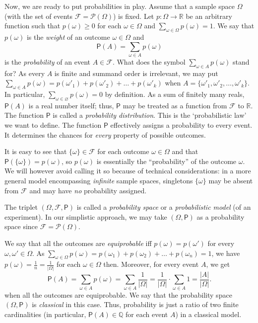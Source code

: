 \documentclass[12pt,notitlepage]{article}
\theoremstyle{plain}
\theoremstyle{definition}
\theoremstyle{plain}
\newcommand{\Q}{\mathbb{Q}}
\newcommand{\R}{\mathbb{R}}
\newcommand{\void}{\varnothing}
\newcommand{\mP}{\mathcal{P}}
\newcommand{\1}{\mathbf{1}}
\newcommand{\0}{\mathbf{0}}
\newcommand{\mF}{\mathcal{F}}
\renewcommand{\P}{\mathsf{P}}
\begin{document}
Now, we are ready to put probabilities in play. Assume that a sample space $\Omega$ (with the set of events $\mF = \mP(\Omega)$) is fixed. Let $p\colon \Omega \to \R$ be an arbitrary function such that $p(\omega) \geq 0$ for each $\omega \in \Omega$ and $\sum_{\omega \in \Omega} p(\omega) = 1$. We say that $p(\omega)$ is the \emph{weight} of an outcome $\omega \in \Omega$ and $$\P(A) = \sum_{\omega \in A} p(\omega)$$ is the \emph{probability} of an event $A \in \mF$. What does the symbol $\sum_{\omega \in A} p(\omega)$ stand for? As every $A$ is finite and summand order is irrelevant, we may put $\sum_{\omega \in A} p(\omega) = p(\omega'_1) + p(\omega'_2) + \ldots + p(\omega'_k)$ when $A = \{\omega'_1, \omega'_2, \ldots, \omega'_k\}$. In particular, $\sum_{\omega \in \void} p(\omega) = 0$ by definition. As a sum of finitely many reals, $\P(A)$ is a real number itself; thus, $\P$ may be treated as a function from $\mF$ to $\R$. The function $\P$ is called a \emph{probability distribution}. This is the `probabilistic law' we want to define. The function $\P$ effectively assigns a probability to every event. It determines the chances for \emph{every} property of possible outcomes.

It is easy to see that $\{ \omega \} \in \mF$ for each outcome $\omega \in \Omega$ and that $\P(\{ \omega \}) = p(\omega)$, so $p(\omega)$ is essentially the ``probability'' of the outcome $\omega$. We will however avoid calling it so because of technical considerations: in a more general model encompassing \emph{infinite} sample spaces, singletons $\{ \omega \}$ may be absent from $\mF$ and may have \emph{no} probability assigned.

The triplet $(\Omega, \mF, \P)$ is called a \emph{probability space} or a \emph{probabilistic model} (of an experiment). In our simplistic approach, we may take $(\Omega, \P)$ as a probability space since $\mF = \mP(\Omega)$.

We say that all the outcomes are \emph{equiprobable} iff $p(\omega) = p(\omega')$ for every $\omega, \omega' \in \Omega$. As $\sum_{\omega \in \Omega} p(\omega) = p(\omega_1) + p(\omega_2) + \ldots + p(\omega_n) = 1$, we have $p(\omega) = \frac{1}{n}= \frac{1}{|\Omega|}$ for each $\omega \in \Omega$ then. Moreover, for every event $A$, we get
$$\P(A) = \sum_{\omega \in A} p(\omega) = \sum_{\omega \in A} \frac{1}{|\Omega|} = \frac{1}{|\Omega|} \cdot \sum_{\omega \in A} 1 = \frac{|A|}{|\Omega|}.$$
when all the outcomes are equiprobable. We say that the probability space $(\Omega, \P)$ is \emph{classical} in this case. Thus, probability is just a ratio of two finite cardinalities (in particular, $\P(A) \in \Q$ for each event $A$) in a classical model.
\end{document}
